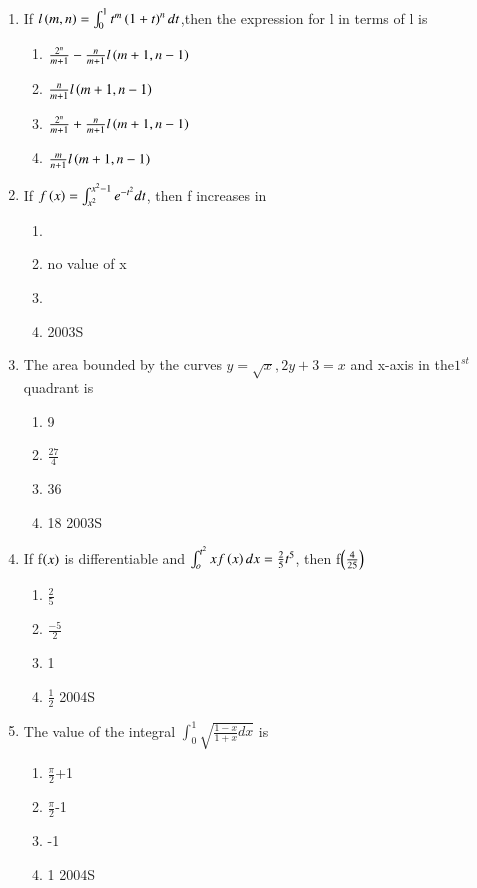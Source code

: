 \documentclass[journal,12pt,twocolumn]{IEEEtran}
\theoremstyle{remark}
\begin{document}
\begin{enumerate}
   \item If $l\left(m,n\right)=\int_{0}^{1} t^{m}\left(1+t\right)^{n} dt$,then the expression for l in terms of l is
\begin{enumerate}
 \item $\frac{2^{n}}{m+1} -\frac{n}{m+1}l\left(m+1,n-1\right)$
 \item $\frac{n}{m+1}l\left(m+1,n-1\right)$
 \item$ \frac{2^{n}}{m+1}+\frac{n}{m+1}l\left(m+1,n-1\right)$
 \item $\frac{m}{n+1}l\left(m+1,n-1\right)$
\end{enumerate}
\item If $f\left(x\right)=\int_{x^{2}}^{x^{2}-1} e^{-t^{2}}dt$, then f increases in
\begin{enumerate}
    \item {}
    \item no value of x
    \item {}
    \item {}
    \hfill{{2003S}}
\end{enumerate}
  \item The area bounded by the curves $ y=\sqrt{x},2y+3=x$  and x-axis in the$ 1^{st}$ quadrant is
\begin{enumerate}
    \item 9
    \item $\frac{27}{4}$
    \item 36
    \item 18
    \hfill{{2003S}}
\end{enumerate}
 \item If f$\left(x\right)$ is differentiable and $\int_{o}^{t^{2}}xf\left(x\right)dx=\frac{2}{5}t^{5}$, then f$\left(\frac{4}{25}\right)$
 \begin{enumerate}
	 \item $\frac{2}{5}$
	 \item $\frac{-5}{2}$
     \item 1
     \item $\frac{1}{2}$
     \hfill{{2004S}}
 \end{enumerate}
 \item The value of the integral $\int_{0}^{1}\sqrt{\frac{1-x}{1+x}dx}$ is
\begin{enumerate}
 \item $\frac{\pi}{2}$+1
 \item $\frac{\pi}{2}$-1
 \item -1
 \item 1
 \hfill{{2004S}}

\end{enumerate}
\end{enumerate}
\end{document}
